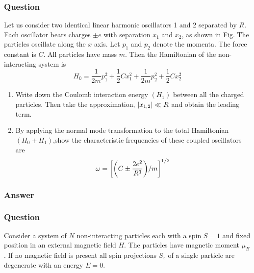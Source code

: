 \subsubsection{Question}
Let us consider two identical linear harmonic oscillators 1 and 2 separated by $R$. Each oscillator bears charges $\pm e$ with separation $x_1$ and $x_2$, as shown in Fig. The particles oscillate along the $x$ axis. Let $p_1$ and $p_2$ denote the momenta. The force constant is $C$. All particles have mass $m$. Then the Hamiltonian of the non-interacting system is
\begin{equation*}
	H_0 = \frac{1}{2m}p_1^2 + \frac{1}{2}Cx_1^2+ \frac{1}{2m}p_2^2+ \frac{1}{2}Cx_2^2
\end{equation*}
\begin{enumerate}
	\item Write down the Coulomb interaction energy $(H_1)$ between all the charged particles. Then take the approximation, $\abs{x_{1,2}}\ll R$ and obtain the leading term.
	\item By applying the normal mode transformation to the total Hamiltonian $(H_0+H_1)$,show the characteristic frequencies of these coupled oscillators are 
	\begin{equation*}
		\omega = \qty[\qty(C\pm \frac{2e^2}{R^3})/m]^{1/2}
	\end{equation*}
\end{enumerate}
\subsubsection{Answer}


\subsubsection{Question}
Consider a system of $N$ non-interacting particles each with a spin $S = 1$ and fixed position in an external magnetic field $H$. The particles have magnetic moment $\mu_B$. If no magnetic field is present all spin projections $S_z$ of a single particle are degenerate with an energy $E = 0$.

